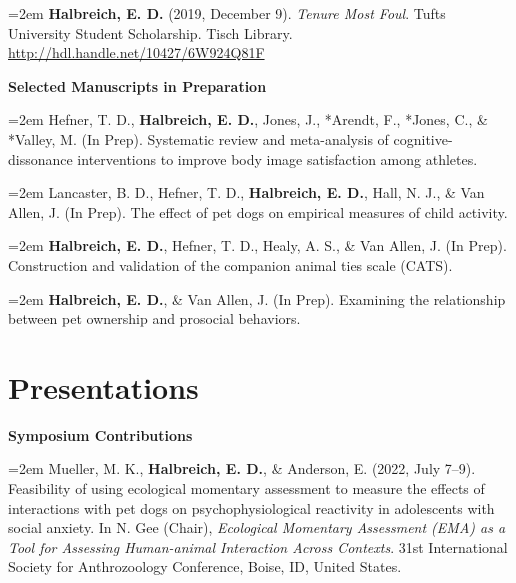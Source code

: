 \documentclass[letter,11pt]{article}
\begin{document}
\hangindent=2em
\textbf{Halbreich, E. D.} (2019, December 9). \textit{Tenure Most Foul}. Tufts University Student Scholarship. Tisch Library. \href{http://hdl.handle.net/10427/6W924Q81F}{http://hdl.handle.net/10427/6W924Q81F}
\vspace{3mm}

\textbf{Selected Manuscripts in Preparation}
\vspace{0.2mm}

\hangindent=2em
Hefner, T. D., \textbf{Halbreich, E. D.}, Jones, J., *Arendt, F., *Jones, C., \& *Valley, M. (In Prep). Systematic review and meta-analysis of cognitive-dissonance interventions to improve body image satisfaction among athletes.
\vspace{1mm}

\hangindent=2em
Lancaster, B. D., Hefner, T. D., \textbf{Halbreich, E. D.}, Hall, N. J., \& Van Allen, J. (In Prep). The effect of pet dogs on empirical measures of child activity.
\vspace{1mm}

\hangindent=2em
\textbf{Halbreich, E. D.}, Hefner, T. D., Healy, A. S., \& Van Allen, J. (In Prep). Construction and validation of the companion animal ties scale (CATS).
\vspace{1mm}

\hangindent=2em
\textbf{Halbreich, E. D.}, \& Van Allen, J. (In Prep). Examining the relationship between pet ownership and prosocial behaviors.

\section{\textbf{Presentations}}

\vspace{-0.4mm}
\vspace{1mm}

\textbf{Symposium Contributions}
\vspace{0.2mm}

\hangindent=2em
Mueller, M. K., \textbf{Halbreich, E. D.}, \& Anderson, E. (2022, July 7--9). Feasibility of using ecological momentary assessment to measure the effects of interactions with pet dogs on psychophysiological reactivity in adolescents with social anxiety. In N. Gee (Chair), \textit{Ecological Momentary Assessment (EMA) as a Tool for Assessing Human-animal Interaction Across Contexts}. 31st International Society for Anthrozoology Conference, Boise, ID, United States.
\vspace{3mm}
\end{document}
